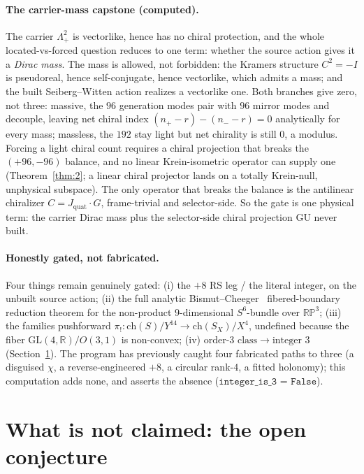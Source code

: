 \documentclass[11pt]{article}
\theoremstyle{definition}
\theoremstyle{remark}
\newcommand{\R}{\mathbb{R}}
\newcommand{\RP}{\mathbb{RP}}
\newcommand{\ch}{\mathrm{ch}}
\newcommand{\Lamp}{\Lambda^2_{+}}
\newcommand{\Jq}{J_{\mathrm{quat}}}
\begin{document}
\paragraph{The carrier-mass capstone (computed).} The carrier $\Lamp$ is vectorlike, hence has no chiral
protection, and the whole located-vs-forced question reduces to one term: whether the source action gives it a
\emph{Dirac mass}. The mass is allowed, not forbidden: the Kramers structure $C^2=-I$ is pseudoreal, hence
self-conjugate, hence vectorlike, which admits a mass; and the built Seiberg--Witten action realizes a vectorlike
one. Both branches give zero, not three: massive, the $96$ generation modes pair with $96$ mirror modes and
decouple, leaving net chiral index $(n_+ - r) - (n_- - r) = 0$ analytically for every mass; massless, the $192$
stay light but net chirality is still $0$, a modulus. Forcing a light chiral count requires a chiral projection
that breaks the $(+96,-96)$ balance, and no linear Krein-isometric operator can supply one (Theorem~\ref{thm:2};
a linear chiral projector lands on a totally Krein-null, unphysical subspace). The only operator that breaks the
balance is the antilinear chiralizer $C=\Jq\cdot G$, frame-trivial and selector-side. So the gate is one physical
term: the carrier Dirac mass plus the selector-side chiral projection GU never built.

\paragraph{Honestly gated, not fabricated.} Four things remain genuinely gated: (i) the $+8$ RS leg / the literal
integer, on the unbuilt source action; (ii) the full analytic Bismut--Cheeger~\cite{bismut1989eta}
fibered-boundary reduction theorem
for the non-product $9$-dimensional $S^6$-bundle over $\RP^3$; (iii) the families pushforward
$\pi_!\colon \ch(S)/Y^{14}\to\ch(S_X)/X^4$, undefined because the fiber $\mathrm{GL}(4,\R)/O(3,1)$ is non-convex;
(iv) $\text{order-}3\text{ class}\to\text{integer }3$ (Section~\ref{sec:open}). The program has previously caught
four fabricated paths to three (a disguised $\chi$, a reverse-engineered $+8$, a circular rank-$4$, a fitted
holonomy); this computation adds none, and asserts the absence ($\texttt{integer\_is\_3 = False}$).

\section{What is not claimed: the open conjecture}\label{sec:open}
\end{document}
